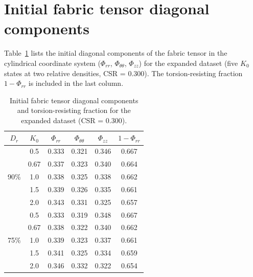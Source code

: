\documentclass[a4paper,fleqn]{cas-sc}
\newcommand{\Kzero}{\ensuremath{K_0}}
\begin{document}
 \section{Initial fabric tensor diagonal components}
\label{sec:appendix_fabric}

Table~\ref{tab:fabric_diagonal} lists the initial diagonal components of the fabric tensor in the cylindrical coordinate system ($\Phi_{rr}$, $\Phi_{\theta\theta}$, $\Phi_{zz}$) for the expanded dataset (five \Kzero{} states at two relative densities, CSR = 0.300). The torsion-resisting fraction $1 - \Phi_{rr}$ is included in the last column.

\begin{table}[h]
\centering
\caption{Initial fabric tensor diagonal components and torsion-resisting fraction for the expanded dataset (CSR = 0.300).}
\label{tab:fabric_diagonal}
\small
\begin{tabular}{cccccc}
\toprule
$D_r$ & \Kzero{} & $\Phi_{rr}$ & $\Phi_{\theta\theta}$ & $\Phi_{zz}$ & $1-\Phi_{rr}$ \\
\midrule
\multirow{5}{*}{90\%}
& 0.5  & 0.333 & 0.321 & 0.346 & 0.667 \\
& 0.67 & 0.337 & 0.323 & 0.340 & 0.664 \\
& 1.0  & 0.338 & 0.325 & 0.338 & 0.662 \\
& 1.5  & 0.339 & 0.326 & 0.335 & 0.661 \\
& 2.0  & 0.343 & 0.331 & 0.325 & 0.657 \\
\midrule
\multirow{5}{*}{75\%}
& 0.5  & 0.333 & 0.319 & 0.348 & 0.667 \\
& 0.67 & 0.338 & 0.322 & 0.340 & 0.662 \\
& 1.0  & 0.339 & 0.323 & 0.337 & 0.661 \\
& 1.5  & 0.341 & 0.325 & 0.334 & 0.659 \\
& 2.0  & 0.346 & 0.332 & 0.322 & 0.654 \\
\bottomrule
\end{tabular}
\end{table}
 


\end{document}
